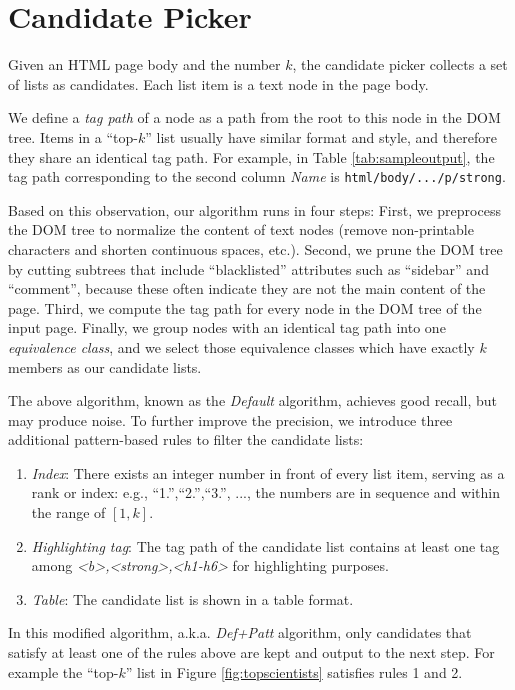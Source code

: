 \section{Candidate Picker}
\label{sec:picker}
Given an HTML page body and the number $k$,
the candidate picker collects a set of lists as candidates.
Each list item is a text node in the page body.

We define a {\em tag path} of a node as a path from the root to this node
in the DOM tree.
Items in a ``top-$k$'' list usually have similar format and style,
and therefore they share an identical tag path.
For example, in Table \ref{tab:sampleoutput},
the tag path corresponding to the second column {\em Name} is
{\tt html/body/.../p/strong}.

Based on this observation, our algorithm runs in four steps:
First, we preprocess the DOM tree to normalize the content of text nodes
(remove non-printable characters and shorten continuous spaces, etc.).
Second, we prune the DOM tree by cutting subtrees that include ``blacklisted''
attributes such as ``sidebar'' and ``comment'', because these often indicate
they are not the main content of the page.
Third, we compute the tag path for every node in the DOM tree of the
input page. Finally, we group nodes with an identical tag path into
one {\em equivalence class}, and we
select those equivalence classes which have exactly $k$ members as our
candidate lists.

The above algorithm, known as the {\em Default} algorithm, achieves good
recall, but may produce noise. To further improve the precision,
we introduce three additional pattern-based rules to filter the candidate lists:

\begin{enumerate}
\item \textit{Index}:
There exists an integer number in front of every list item, serving as
a rank or index: e.g., ``1.'',``2.'',``3.'', ..., the numbers are in sequence
and within the range of $[1, k]$.

\item \textit{Highlighting tag}:
The tag path of the candidate list contains at least one tag
among {\em <b>,<strong>,<h1-h6>} for highlighting purposes.

\item \textit{Table}:
The candidate list is shown in a table format.
\end{enumerate}

In this modified algorithm, a.k.a. {\em Def+Patt} algorithm,
only candidates that satisfy at least one of the rules above are
kept and output to the next step.
For example the ``top-$k$'' list in Figure \ref{fig:topscientists}
satisfies rules 1 and 2.

